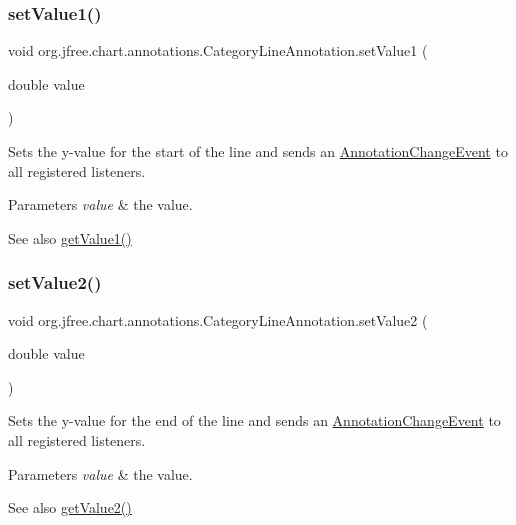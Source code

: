 \subsubsection{\texorpdfstring{set\+Value1()}{setValue1()}}
{\footnotesize\ttfamily void org.\+jfree.\+chart.\+annotations.\+Category\+Line\+Annotation.\+set\+Value1 (\begin{DoxyParamCaption}\item[{double}]{value }\end{DoxyParamCaption})}

Sets the y-\/value for the start of the line and sends an \mbox{\hyperlink{}{Annotation\+Change\+Event}} to all registered listeners.


\begin{DoxyParams}{Parameters}
{\em value} & the value.\\
\hline
\end{DoxyParams}
\begin{DoxySeeAlso}{See also}
\mbox{\hyperlink{classorg_1_1jfree_1_1chart_1_1annotations_1_1_category_line_annotation_a5237dccaaf690f7352535377216b04f5}{get\+Value1()}} 
\end{DoxySeeAlso}
\mbox{\label{classorg_1_1jfree_1_1chart_1_1annotations_1_1_category_line_annotation_a5857a0ef19b2eed096cd086cbcb972d6}} 
\subsubsection{\texorpdfstring{set\+Value2()}{setValue2()}}
{\footnotesize\ttfamily void org.\+jfree.\+chart.\+annotations.\+Category\+Line\+Annotation.\+set\+Value2 (\begin{DoxyParamCaption}\item[{double}]{value }\end{DoxyParamCaption})}

Sets the y-\/value for the end of the line and sends an \mbox{\hyperlink{}{Annotation\+Change\+Event}} to all registered listeners.


\begin{DoxyParams}{Parameters}
{\em value} & the value.\\
\hline
\end{DoxyParams}
\begin{DoxySeeAlso}{See also}
\mbox{\hyperlink{classorg_1_1jfree_1_1chart_1_1annotations_1_1_category_line_annotation_ad87150da9363210985e430ad0c1135e2}{get\+Value2()}} 
\end{DoxySeeAlso}


